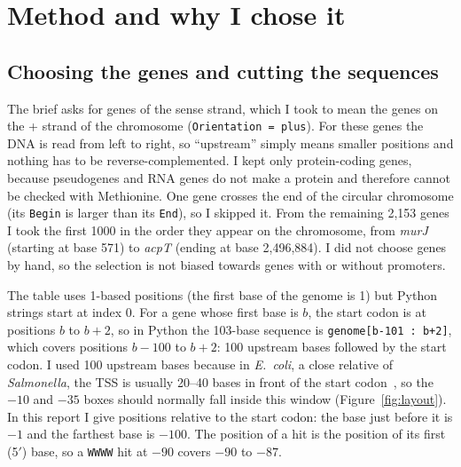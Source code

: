 \documentclass[11pt,a4paper]{article}
\newcommand{\gene}[1]{\textit{#1}}
\newcommand{\seqs}[1]{\texttt{#1}}
\begin{document}
\section{Method and why I chose it}
\subsection{Choosing the genes and cutting the sequences}
The brief asks for genes of the sense strand, which I took to mean the genes on the + strand of the
chromosome (\texttt{Orientation = plus}). For these genes the DNA is read from left to right, so
``upstream'' simply means smaller positions and nothing has to be reverse-complemented. I kept only
protein-coding genes, because pseudogenes and RNA genes do not make a protein and therefore cannot be
checked with Methionine. One gene crosses the end of the circular chromosome (its \texttt{Begin} is
larger than its \texttt{End}), so I skipped it. From the remaining 2,153 genes I took the first 1000
in the order they appear on the chromosome, from \gene{murJ} (starting at base 571) to \gene{acpT}
(ending at base 2,496,884). I did not choose genes by hand, so the selection is not biased towards
genes with or without promoters.

The table uses 1-based positions (the first base of the genome is 1) but Python strings start at
index 0. For a gene whose first base is $b$, the start codon is at positions $b$ to $b+2$, so in
Python the 103-base sequence is \texttt{genome[b-101 : b+2]}, which covers positions $b-100$ to
$b+2$: 100 upstream bases followed by the start codon. I used 100 upstream bases because in
\textit{E.~coli}, a close relative of \textit{Salmonella}, the TSS is usually 20--40 bases in front of
the start codon~\cite{mendoza}, so the $-10$ and $-35$ boxes should normally fall inside this window
(Figure~\ref{fig:layout}). In this report I give positions relative to the start codon: the base just
before it is $-1$ and the farthest base is $-100$. The position of a hit is the position of its first
(5$'$) base, so a \seqs{WWWW} hit at $-90$ covers $-90$ to $-87$.
\end{document}
